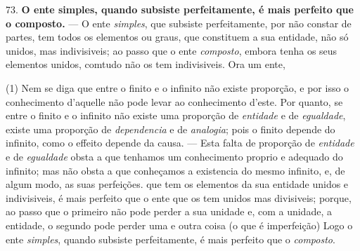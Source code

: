 73. \textbf{O ente simples, quando subsiste perfeitamente, é mais perfeito que o composto.} --- O ente \emph{simples}, que subsiste perfeitamente, por não constar de partes, tem todos os elementos ou graus, que constituem a sua entidade, não só unidos, mas indivisiveis; ao passo que o ente \emph{composto}, embora tenha os seus elementos unidos, comtudo não os tem indivisiveis. Ora um ente,

(1) Nem se diga que entre o finito e o infinito não existe proporção, e por isso o conhecimento d'aquelle não pode levar ao conhecimento d'este. Por quanto, se entre o finito e o infinito não existe uma proporção de \emph{entidade} e de \emph{egualdade}, existe uma proporção de \emph{dependencia} e de \emph{analogia}; pois o finito depende do infinito, como o effeito depende da causa. --- Esta falta de proporção de \emph{entidade} e de \emph{egualdade} obsta a que tenhamos um conhecimento proprio e adequado do infinito; mas não obsta a que conheçamos a existencia do mesmo infinito, e, de algum modo, as suas perfeições.
 que tem os elementos da sua entidade unidos e indivisiveis, é mais perfeito que o ente que os tem unidos mas divisiveis; porque, ao passo que o primeiro não pode perder a sua unidade e, com a unidade, a entidade, o segundo pode perder uma e outra coisa (o que é imperfeição) Logo o ente \emph{simples}, quando subsiste perfeitamente, é mais perfeito que o \emph{composto}.

